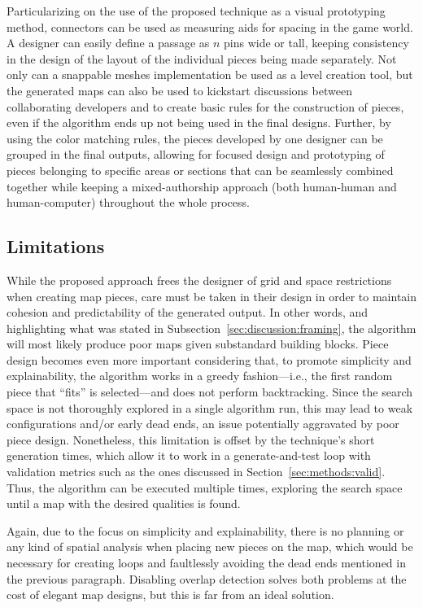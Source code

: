 \documentclass[journal]{IEEEtran}
\begin{document}
Particularizing on the use of the proposed technique as a visual prototyping method,
connectors can be used as measuring aids for spacing in the game world. A designer can
easily define a passage as $n$ pins wide or tall, keeping consistency in the design of
the layout of the individual pieces being made separately. Not only can a snappable
meshes implementation be used as a level creation tool, but the generated maps can also
be used to kickstart discussions between collaborating developers and to create basic
rules for the construction of pieces, even if the algorithm ends up not being used in
the final designs. Further, by using the color matching rules, the pieces developed by
one designer can be grouped in the final outputs, allowing for focused design and
prototyping of pieces belonging to specific areas or sections that can be seamlessly
combined together while keeping a mixed-authorship approach (both human-human and
human-computer) throughout the whole process.

\subsection{Limitations}
\label{sec:discussion:lims}

While the proposed approach frees the designer of grid and space restrictions
when creating map pieces, care must be taken in their design in order to
maintain cohesion and predictability of the generated output. In other words,
and highlighting what was stated in Subsection~\ref{sec:discussion:framing},
the algorithm will most likely produce poor maps given substandard building
blocks.
Piece design becomes even more important considering that, to promote
simplicity and explainability, the algorithm works in a greedy fashion---i.e.,
the first random piece that ``fits'' is selected---and does not perform
backtracking. Since the search space is not thoroughly explored in a single
algorithm run, this may lead to weak configurations and/or early dead ends, an
issue potentially aggravated by poor piece design. Nonetheless, this
limitation is offset by the technique's short generation times, which allow it
to work in a generate-and-test loop with validation metrics such as the ones
discussed in Section~\ref{sec:methods:valid}. Thus, the algorithm can be
executed multiple times, exploring the search space until a map with the desired
qualities is found.

Again, due to the focus on simplicity and explainability, there is no planning
or any kind of spatial analysis when placing new pieces on the map, which would
be necessary for creating loops and faultlessly avoiding the dead ends mentioned
in the previous paragraph. Disabling overlap detection solves both problems at the
cost of elegant map designs, but this is far from an ideal solution.
\end{document}
